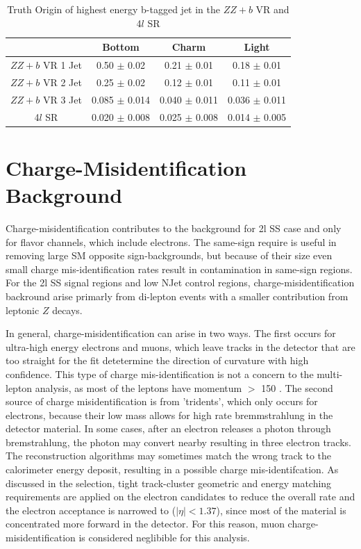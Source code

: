 \begin{table}[htbp]
\centering 
\begin{tabular}{|c|c|c|c|} 
  \hline
                 & Bottom      & Charm       & Light \\
  \hline
  $ZZ+b$ VR 1 Jet& 0.50  $\pm$ 0.02  & 0.21  $\pm$ 0.01  & 0.18  $\pm$ 0.01 \\ 
  $ZZ+b$ VR 2 Jet& 0.25  $\pm$ 0.02  & 0.12  $\pm$ 0.01  & 0.11  $\pm$ 0.01 \\ 
  $ZZ+b$ VR 3 Jet& 0.085 $\pm$ 0.014 & 0.040 $\pm$ 0.011 & 0.036 $\pm$ 0.011 \\
  4$l$ SR        & 0.020 $\pm$ 0.008 & 0.025 $\pm$ 0.008 & 0.014 $\pm$ 0.005 \\
  \hline 
\end{tabular}
\caption{Truth Origin of highest energy b-tagged jet in the $ZZ+b$ VR and 4$l$ SR} 
\label{table:zz_truth}
\end{table} 


\section{Charge-Misidentification Background }
\label{section:qmis} 
Charge-misidentification contributes to the background for 2l SS case and only for flavor channels, which include electrons. The same-sign require is useful in removing large SM opposite sign-backgrounds, but because of their size even small charge mis-identification rates result in contamination in same-sign regions. For the 2l SS signal regions and low NJet control regions, charge-misidentification backround arise primarly from \ttbar di-lepton events with a smaller contribution from leptonic $Z$ decays. 

In general, charge-misidentification can arise in two ways. The first occurs for ultra-high energy electrons and muons, which leave tracks in the detector that are too straight for the fit detetermine the direction of curvature with high confidence. This type of charge mis-identification is not a concern to the \tth multi-lepton analysis, as most of the leptons have momentum $>$ 150 \gevc. The second source of charge misidentification is from 'tridents', which only occurs for electrons, because their low mass allows for high rate bremmstrahlung in the detector material. In some cases, after an electron releases a photon through bremstrahlung, the photon may convert nearby resulting in three electron tracks. The reconstruction algorithms may sometimes match the wrong track to the calorimeter energy deposit, resulting in a possible charge mis-identifcation. As discussed in the selection, tight track-cluster geometric and energy matching requirements are applied on the electron candidates to reduce the overall rate and the electron acceptance is narrowed to ($|\eta| < 1.37$), since most of the material is concentrated more forward in the detector. For this reason, muon charge-misidentification is considered neglibible for this analysis.

